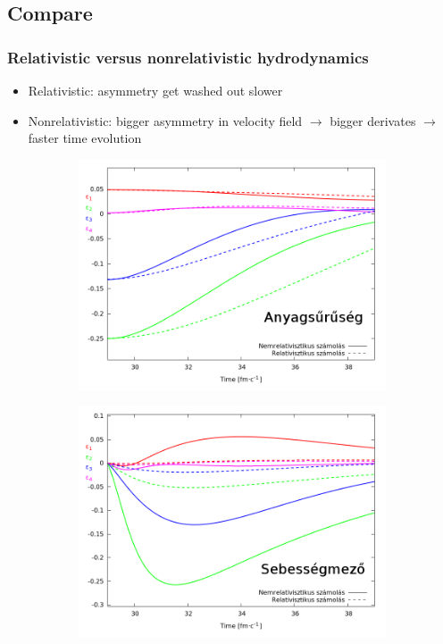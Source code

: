 \documentclass{beamer}
\begin{document}
\subsection{Compare}
\begin{frame}[noframenumbering]
\frametitle{Relativistic versus nonrelativistic hydrodynamics}
\begin{center}
\begin{itemize}
\setlength{\itemsep}{12pt}
\item<1-> Relativistic: asymmetry get washed out slower
\item<1-> Nonrelativistic: bigger asymmetry in velocity field $\rightarrow$ bigger derivates $\rightarrow$ faster time evolution

\end{itemize}
\begin{figure}[H]
	\centering
    \begin{subfigure}[b]{0.49\textwidth}
    		\includegraphics[width=\textwidth]{pic/res/relnonrel_n}
	\end{subfigure}
	\begin{subfigure}[b]{0.49\textwidth}
        	\includegraphics[width=\textwidth]{pic/res/relnonrel_v}
	\end{subfigure}
\end{figure}
\end{center}
\end{frame}
\end{document}
